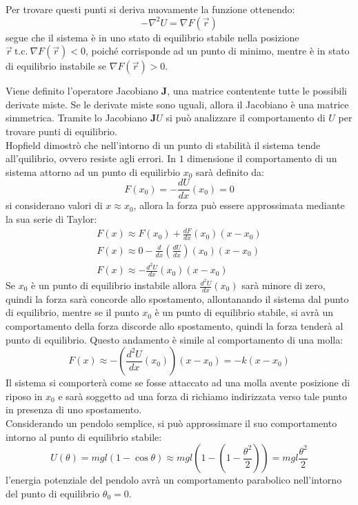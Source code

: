 \documentclass{article}
\numberwithin{equation}{subsection}
\begin{document}
Per trovare questi punti si deriva nuovamente la funzione 
ottenendo:
\begin{equation*}
    -\nabla^{2}U=\nabla F(\vec{r})
\end{equation*}
segue che il sistema è in uno stato di equilibrio stabile nella 
posizione $\vec{r}\:\mbox{t.c.}\:\nabla F(\vec{r})<0$, poiché 
corrisponde ad un punto di minimo, mentre è in stato di 
equilibrio instabile se $\nabla F(\vec{r})>0$.



Viene definito l'operatore Jacobiano $\mathbf{J}$, una matrice contentente tutte 
le possibili derivate miste. Se le derivate miste sono uguali, 
allora il Jacobiano è una matrice simmetrica. Tramite lo 
Jacobiano $\mathbf{J}U$ si può analizzare il comportamento di $U$ 
per trovare punti di equilibrio.
\\
Hopfield dimostrò che nell'intorno di un punto di stabilità 
il sistema tende all'quilibrio, ovvero resiste agli errori. 
In $1$ dimensione il comportamento di un sistema attorno ad un 
punto di equilirbio $x_0$ sarà definito da:
\begin{equation}
    F(x_0)=-\displaystyle\frac{dU}{dx}(x_0)=0
\end{equation}
si considerano valori di $x\approx x_0$, allora la forza può 
essere approssimata mediante la sua serie di Taylor:
\begin{gather*}
    F(x)\approx F(x_0)+\displaystyle\frac{dF}{dx}(x_0)(x-x_0)\\
    F(x)\approx 0-\displaystyle\frac{d}{dx}\left(\frac{dU}{dx}\right)(x_0)(x-x_0)\\
    F(x)\approx -\displaystyle\frac{d^{2}U}{dx}(x_0)(x-x_0)
\end{gather*}
Se $x_0$ è un punto di equilibrio instabile allora $\displaystyle\frac{d^{2}U}{dx}(x_0)$ 
sarà minore di zero, quindi la forza sarà concorde allo 
spostamento, allontanando il sistema dal punto di equilibrio, mentre 
se il punto $x_0$ è un punto di equilibrio stabile, si avrà 
un comportamento della forza discorde allo spostamento, quindi 
la forza tenderà al punto di equilibrio. Questo andamento  
è simile al comportamento di una molla:
\begin{equation}
    F(x)\approx -\left(\displaystyle\frac{d^{2}U}{dx}(x_0)\right)(x-x_0)=-k(x-x_0)
\end{equation}
Il sistema si comporterà come se fosse attaccato ad una molla avente 
posizione di riposo in $x_0$ e sarà soggetto ad una forza di 
richiamo indirizzata verso tale punto in presenza di uno 
spostamento. 
\\
Considerando un pendolo semplice, si può approssimare il suo comportamento intorno al punto di equilibrio stabile: 
\begin{equation*}
    U(\theta) = mgl(1-\cos\theta)\approx mgl\left(1-\left(1-\displaystyle\frac{\theta^{2}}{2}\right)\right)=mgl\frac{\theta^2}{2}
\end{equation*}
l'energia potenziale del pendolo avrà un comportamento parabolico 
nell'intorno del punto di equilibrio $\theta_0=0$.
\end{document}

